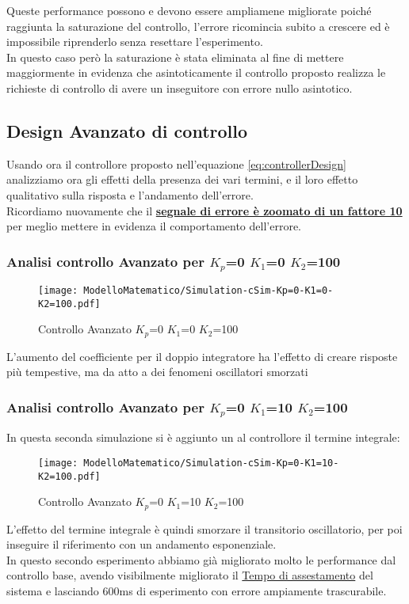 \noindent
Queste performance possono e devono essere ampliamene migliorate poiché raggiunta la saturazione del controllo, l'errore ricomincia subito a crescere ed è impossibile riprenderlo senza resettare l'esperimento.\\
In questo caso però la saturazione è stata eliminata al fine di mettere maggiormente in evidenza che asintoticamente il controllo proposto realizza le richieste di controllo di avere un inseguitore con errore nullo asintotico.

\newpage
\subsection{Design Avanzato di controllo}
Usando ora il controllore proposto nell'equazione \ref{eq:controllerDesign} analizziamo ora gli effetti della presenza dei vari termini, e il loro effetto qualitativo sulla risposta e l'andamento dell'errore.\\
Ricordiamo nuovamente che il {\color{red}\textbf{\underline{segnale di errore è zoomato di un fattore 10}}} per meglio mettere in evidenza il comportamento dell'errore.

\subsubsection{Analisi controllo Avanzato per $ K_p $=0 $ K_1 $=0 $ K_2 $=100}
\begin{figure}[H]
	\centering
	\caption[Controllo Avanzato $ K_p $=0 $ K_1 $=0 $ K_2 $=100] {Controllo Avanzato $ K_p $=0 $ K_1 $=0 $ K_2 $=100}
	\texttt{[image: ModelloMatematico/Simulation-cSim-Kp=0-K1=0-K2=100.pdf]}
\end{figure}
\noindent
L'aumento del coefficiente per il doppio integratore ha l'effetto di creare risposte più tempestive, ma da atto a dei fenomeni oscillatori smorzati

\subsubsection{Analisi controllo Avanzato per $ K_p $=0 $ K_1 $=10 $ K_2 $=100}
In questa seconda simulazione si è aggiunto un al controllore il termine integrale:
\begin{figure}[H]
	\centering
	\caption[Controllo Avanzato $ K_p $=0 $ K_1 $=10 $ K_2 $=100]{Controllo Avanzato $ K_p $=0 $ K_1 $=10 $ K_2 $=100}
	\texttt{[image: ModelloMatematico/Simulation-cSim-Kp=0-K1=10-K2=100.pdf]}
\end{figure}
\noindent
L'effetto del termine integrale è quindi smorzare il transitorio oscillatorio, per poi inseguire il riferimento con un andamento esponenziale.\\
In questo secondo esperimento abbiamo già migliorato molto le performance dal controllo base, avendo visibilmente migliorato il \underline{Tempo di assestamento} del sistema e lasciando 600ms di esperimento con errore ampiamente trascurabile.
\newpage
